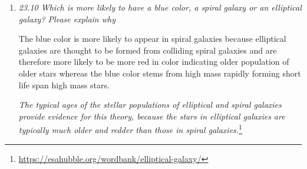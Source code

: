 \documentclass[./exercises.tex]{subfiles}
\begin{document}
\begin{enumerate}
\item\textit{23.10 Which is more likely to have a blue color, a spiral galaxy or an elliptical galaxy?
Please explain why}
 
The blue color is more likely to appear in spiral galaxies because elliptical galaxies
are thought to be formed from colliding spiral galaxies and are therefore more likely to be more
red in color indicating older population of older stars whereas the blue color stems from high mass rapidly
forming short life span high mass stars.

\textit{The typical ages of the stellar populations of elliptical and spiral galaxies provide evidence for this theory,
because the stars in elliptical galaxies are typically
much older and redder than those in spiral galaxies.}\footnote{\url{https://esahubble.org/wordbank/elliptical-galaxy/}}


 

\end{enumerate}








\end{document}
